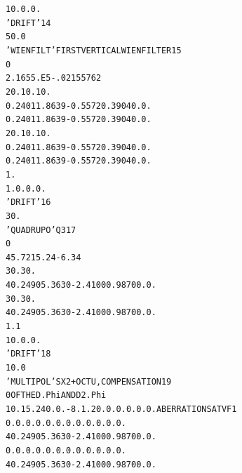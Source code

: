 \begin{tiny}
\begin{alltt}
    1  0. 0. 0.                                                                 
   'DRIFT'                                                                14
     50.0                                                                       
    'WIENFILT'                           FIRST  VERTICAL  WIEN  FILTER    15
    0                                                       
   2.16  55.E5  -.0215576  2                                                    
   20. 10. 10.                                                                  
   0.2401  1.8639  -0.5572  0.3904 0. 0.                                        
   0.2401  1.8639  -0.5572  0.3904 0. 0.                                        
   20. 10. 10.                                                                  
   0.2401  1.8639  -0.5572  0.3904 0. 0.                                        
   0.2401  1.8639  -0.5572  0.3904 0. 0.                                        
   1.                                                       
  1. 0. 0. 0.                                                                   
   'DRIFT'                                                                16
     30.                                                                        
   'QUADRUPO'                            Q3                               17
   0                                                        
     45.72  15.24  -6.34                                                        
    30. 30.                                                                     
    4    0.2490   5.3630  -2.4100   0.9870   0.   0.                            
    30. 30.                                                                     
    4    0.2490   5.3630  -2.4100   0.9870   0.   0.                            
     1.1                                                                        
    1  0. 0. 0.                                                                 
   'DRIFT'                                                                18
    10.0                                                                        
   'MULTIPOL'                            SX2 + OCTU, COMPENSATION         19
   0                                     OF  THE  D.Phi  AND  D2.Phi            
   10.  15.24   0. 0. -8.  1.2  0. 0. 0. 0. 0. 0.    ABERRATIONS  AT  VF1       
    0. 0. 0. 0. 0. 0. 0. 0. 0. 0. 0. 0.                                         
    4    0.2490   5.3630  -2.4100   0.9870   0.   0.                            
    0. 0. 0. 0. 0. 0. 0. 0. 0. 0. 0. 0.                                         
    4    0.2490   5.3630  -2.4100   0.9870   0.   0.                            

\end{alltt}
\end{tiny}
